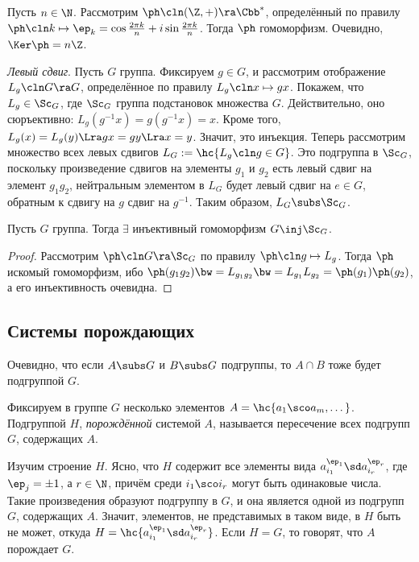 \documentclass[a4paper]{article}
\newcommand{\kph}{\Ker \ph}
\begin{document}
\begin{ex}

 Пусть $n \in \N$. Рассмотрим $\ph\cln (\Z, +) \ra \Cbb^*$, определённый по правилу $\ph\cln k \mapsto
\ep_k = \cos\frac{2\pi k}{n} + i\sin \frac{2\pi k}{n}$. Тогда $\ph$ гомоморфизм. Очевидно, $\kph = n\Z$.

 \emph{Левый сдвиг}. Пусть $G$ группа. Фиксируем $g \in G$, и рассмотрим отображение
$L_g\cln G \ra G$, определённое по правилу $L_g\cln x \mapsto gx$. Покажем, что $L_g \in \Sc_G$, где
$\Sc_G$ группа подстановок множества $G$. Действительно, оно сюръективно:
$L_g(g^{-1}x)=g(g^{-1}x)=x$. Кроме того, $L_g(x)=L_g(y) \Lra gx=gy \Lra x=y$. Значит, это инъекция.
Теперь рассмотрим множество всех левых сдвигов $L_G := \hc{L_g\cln g \in G}$. Это подгруппа в $\Sc_G$,
поскольку произведение сдвигов на элементы $g_1$ и $g_2$ есть левый сдвиг на элемент $g_1g_2$,
нейтральным элементом в $L_G$ будет левый сдвиг на $e \in G$, обратным к сдвигу на $g$
сдвиг на $g^{-1}$. Таким образом, $L_G \subs \Sc_G$.
\end{ex}

\begin{theorem}[Кэли]
Пусть $G$ группа. Тогда $\exi$ инъективный гомоморфизм $G \inj \Sc_G$.
\end{theorem}
\begin{proof}
Рассмотрим $\ph\cln G \ra \Sc_G$ по правилу $\ph\cln g \mapsto L_g$. Тогда $\ph$ искомый гомоморфизм, ибо
$\ph(g_1g_2) \bw= L_{g_1g_2} \bw= L_{g_1}L_{g_2}=\ph(g_1)\ph(g_2)$, а его инъективность очевидна.
\end{proof}

\subsection{Системы порождающих}

Очевидно, что если $A \subs G$ и $B \subs G$ подгруппы, то $A \cap B$ тоже будет подгруппой $G$.

\begin{df}
Фиксируем в группе $G$ несколько элементов $A=\hc{a_1\sco a_m,\dots}$. Подгруппой $H$,
\emph{порождённой} системой $A$, называется пересечение всех подгрупп $G$, содержащих $A$.
\end{df}

Изучим строение $H$. Ясно, что $H$ содержит все элементы вида $a_{i_1}^{\ep_1}\sd a_{i_r}^{\ep_r}$,
где $\ep_j = \pm 1$, а $r \in \N$, причём среди $i_1\sco i_r$ могут быть одинаковые числа. Такие
произведения образуют подгруппу в $G$, и она является одной из подгрупп $G$, содержащих $A$.
Значит, элементов, не представимых в таком виде, в $H$ быть не может, откуда
$H= \hc{a_{i_1}^{\ep_1}\sd a_{i_r}^{\ep_r}}$. Если $H=G$, то говорят, что $A$ порождает $G$.
\end{document}
